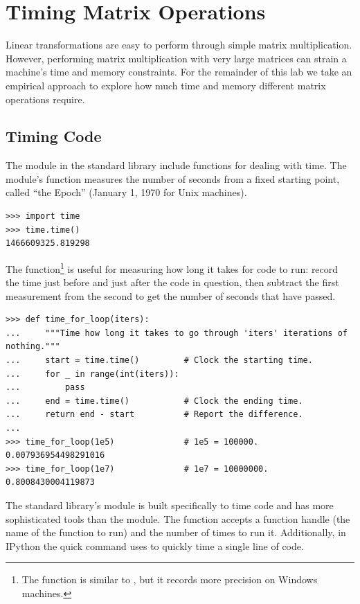 \section*{Timing Matrix Operations} %

Linear transformations are easy to perform through simple matrix multiplication.
However, performing matrix multiplication with very large matrices can strain a machine's time and memory constraints.
For the remainder of this lab we take an empirical approach to explore how much time and memory different matrix operations require.

\subsection*{Timing Code} %

The  module in the standard library include functions for dealing with time.
The module's  function measures the number of seconds from a fixed starting point, called ``the Epoch'' (January 1, 1970 for Unix machines).

\begin{lstlisting}
>>> import time
>>> time.time()
1466609325.819298
\end{lstlisting}

The  function\footnote{The  function is similar to , but it records more precision on Windows machines.} is useful for measuring how long it takes for code to run: record the time just before and just after the code in question, then subtract the first measurement from the second to get the number of seconds that have passed.

\begin{lstlisting}
>>> def time_for_loop(iters):
...     """Time how long it takes to go through 'iters' iterations of nothing."""
...     start = time.time()         # Clock the starting time.
...     for _ in range(int(iters)):
...         pass
...     end = time.time()           # Clock the ending time.
...     return end - start          # Report the difference.
...
>>> time_for_loop(1e5)              # 1e5 = 100000.
0.007936954498291016
>>> time_for_loop(1e7)              # 1e7 = 10000000.
0.8008430004119873
\end{lstlisting}

The standard library's  module is built specifically to time code and has more sophisticated tools than the  module.
The  function accepts a function handle (the name of the function to run) and the number of times to run it.
Additionally, in IPython the quick command  uses  to quickly time a single line of code.

